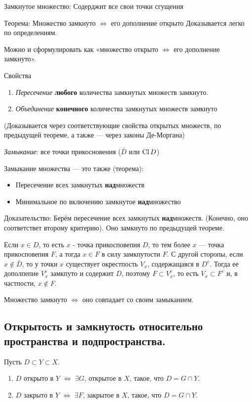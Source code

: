 \documentclass[12pt, a4paper]{article}
\begin{document}
Замкнутое множество: Содерджит все свои точки сгущения

Теорема: Множество замкнуто $\Longleftrightarrow$ его дополнение открыто
Доказывается легко по определениям.

Можно и сформулировать как «множество открыто $\Longleftrightarrow$ его дополнение замкнуто».


Свойства
\begin{enumerate}
    \item \textit{Пересечение} \textbf{любого} количества замкнутых множеств замкнуто.
    \item \textit{Объединение} \textbf{конечного} количества замкнутых множеств замкнуто
\end{enumerate}

(Доказывается через соответствующие свойства открытых множеств,
по предыдущей теореме, а также — через законы Де-Моргана)
    
\textit{Замыкание}: все точки прикосновения ($\overline{D}$ или $\operatorname{Cl} D$)

Замыкание множества — это также (теорема):

\begin{itemize}
    \item Пересечение всех замкнутых \textbf{над}множеств
    \item Минимальное по включению замкнутое \textbf{над}множество
\end{itemize}

Доказательство: Берём пересечение всех замкнутых \textbf{над}множеств.
(Конечно, оно соответствет второму критерию). Оно замкнуто по предыдущей теореме.

Если $x \in D$, то есть $x$ - точка прикосповепия $D$, то тем более $x$ — точка прикосповепия $F$, а тогда $x \in F$ в силу замкпутости $F.$ С другой сторопы, если $x \notin \bar{D}$, то у точки $x$ существует окрестпость $V_{x}$, содержащаяся в $D^{c} .$ Тогда ее дополпепие $V_{x}^{c}$ замкпуто и содержит $D$, поэтому $F \subset V_{x}^{c}$, то есть $V_{x} \subset F^{c}$ и, в частпости, $x \notin F .$

Множество замкнуто $\Longleftrightarrow$ оно совпадает со своим замыканием.


\subsection{Открытость и замкнутость относительно пространства и подпространства.}

Пусть $D \subset Y \subset X$.
\begin{enumerate}
    \item $D$ открыто в $Y$ $\Longleftrightarrow$ $\exists G$, 
    открытое в $X$, такое, что $D = G \cap Y$.
    \item $D$ закрыто в $Y$ $\Longleftrightarrow$ $\exists F$, 
    закрытое в $X$, такое, что $D = G \cap Y$.
\end{enumerate}
\end{document}
